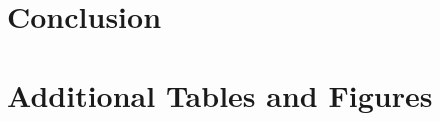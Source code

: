 \documentclass[11pt,a4paper,oneside]{report}
\begin{document}
\chapter{Conclusion}\label{ch:conclusion}


\clearpage



\appendix

\chapter{Additional Tables and Figures} \label{ch:appendix}

\end{document}
